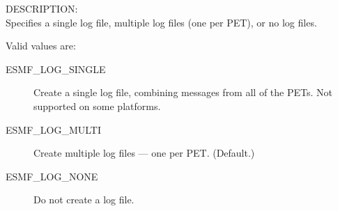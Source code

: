 \label{opt:logtype}
{\sf DESCRIPTION:\\}
Specifies a single log file, multiple log files (one per PET), or no log files.

Valid values are:
\begin{description}
   \item [ESMF\_LOG\_SINGLE] 
         Create a single log file, combining messages from all of the PETs.  Not supported on some platforms.
   \item [ESMF\_LOG\_MULTI]
         Create multiple log files --- one per PET.  (Default.)
   \item [ESMF\_LOG\_NONE]
         Do not create a log file.
\end{description}





